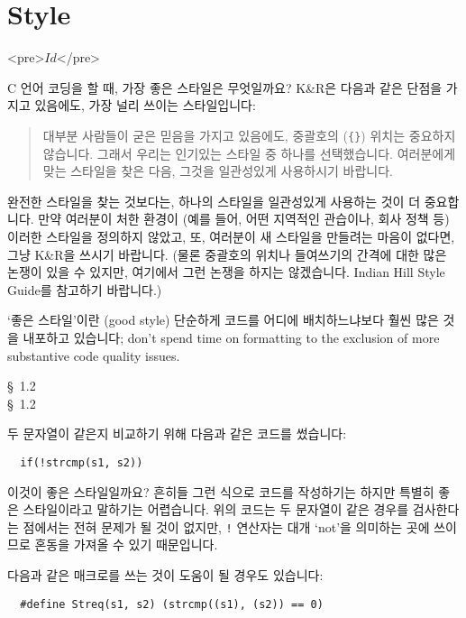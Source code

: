 \chapter{Style}	\label{chap:style}

\begin{rawhtml}
<pre>$Id$</pre>
\end{rawhtml}

\begin{faq}
	C 언어 코딩을 할 때, 가장 좋은 스타일은 무엇일까요?
\A
	K\&R은 다음과 같은 단점을 가지고 있음에도, 가장 널리 쓰이는
	스타일입니다:
\begin{quote}
	대부분 사람들이 굳은 믿음을 가지고 있음에도, 중괄호의 (\verb+{}+)
	위치는 중요하지 않습니다.  그래서 우리는 인기있는 스타일 중
	하나를 선택했습니다.  여러분에게 맞는 스타일을 찾은 다음,
	그것을 일관성있게 사용하시기 바랍니다.
\end{quote}

	완전한 스타일을 찾는 것보다는, 하나의 스타일을 일관성있게
	사용하는 것이 더 중요합니다.  만약 여러분이 처한 환경이 (예를 들어,
	어떤 지역적인 관습이나, 회사 정책 등) 이러한 스타일을 정의하지
	않았고, 또, 여러분이 새 스타일을 만들려는 마음이 없다면,
	그냥 K\&R을 쓰시기 바랍니다.  (물론 중괄호의 위치나 들여쓰기의
	간격에 대한 많은 논쟁이 있을 수 있지만, 여기에서 그런 논쟁을
	하지는 않겠습니다.  Indian Hill Style Guide를 참고하기 바랍니다.)

	`좋은 스타일'이란 (good style) 단순하게 코드를 어디에 배치하느냐보다
	훨씬 많은 것을 내포하고 있습니다; don't spend time on formatting to the
	exclusion of more substantive code quality issues.

\R
	\cite{kr1} \S\ 1.2  \\
	\cite{kr2} \S\ 1.2 
\end{faq}

\begin{faq}
	두 문자열이 같은지 비교하기 위해 다음과 같은 코드를 썼습니다:
\begin{verbatim}
  if(!strcmp(s1, s2))
\end{verbatim}
	\noindent 이것이 좋은 스타일일까요?
\A
	흔히들 그런 식으로 코드를 작성하기는 하지만 특별히 좋은 스타일이라고
	말하기는 어렵습니다.  위의 코드는 두 문자열이 같은 경우를 검사한다는
	점에서는 전혀 문제가 될 것이 없지만, \verb+!+ 연산자는
	대개 `not'을 의미하는 곳에 쓰이므로 혼동을 가져올 수 있기 때문입니다.

	다음과 같은 매크로를 쓰는 것이 도움이 될 경우도 있습니다:
\begin{verbatim}
  #define Streq(s1, s2) (strcmp((s1), (s2)) == 0)
\end{verbatim}

\end{faq}

